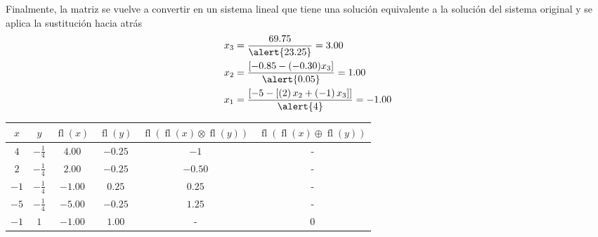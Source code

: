 \documentclass[
	spanish,
	8pt,
	utf8,
	xcolor=table,
	handout,
	aspectratio=169,
	professionalfonts,
	mathserif,
	leqno,
]{beamer}
\begin{document}
\begin{frame}
\begin{minipage}{0.35\textwidth}
		Finalmente, la matriz se vuelve a convertir en un sistema
		lineal que tiene una solución equivalente a la solución del
		sistema original y se aplica la sustitución hacia atrás
		\begin{align*}
			x_{3} & =\frac{69.75}{\alert{23.25}}=3.00                                                              \\
			x_{2} & =\frac{\left[-0.85-(-0.30)x_{3}\right]}{\alert{0.05}}=1.00                                     \\
			x_{1} & =\frac{\left[-5-\left[\left(2\right)x_{2}+\left(-1\right)x_{3}\right]\right]}{\alert{4}}=-1.00
		\end{align*}
	\end{minipage}
	\begin{minipage}{0.6\textwidth}
		\begin{table}[ht!]
			\centering
			\tiny
			\begin{tabular}{|cccccc|}
				\hline
				$x$                                                                                                   & $y$                               &
				$\operatorname{fl}\left(x\right)$                                                                     & $\operatorname{fl}\left(y\right)$ &
				$\operatorname{fl}\left(\operatorname{fl}\left(x\right)\otimes\operatorname{fl}\left(y\right)\right)$ &
				$\operatorname{fl}\left(\operatorname{fl}\left(x\right)\oplus\operatorname{fl}\left(y\right)\right)$                                                                              \\
				\hline
				$4$                                                                                                   & $-\tfrac{1}{4}$                   & $4.00$  & $-0.25$ & $-1$    & -       \\
				$2$                                                                                                   & $-\tfrac{1}{4}$                   & $2.00$  & $-0.25$ & $-0.50$ & -       \\
				$-1$                                                                                                  & $-\tfrac{1}{4}$                   & $-1.00$ & $0.25$  & $0.25$  & -       \\
				$-5$                                                                                                  & $-\tfrac{1}{4}$                   & $-5.00$ & $-0.25$ & $1.25$  & -       \\
				$-1$                                                                                                  & $1$                               & $-1.00$ & $1.00$  & -       & $0$     \\

\end{tabular}
\end{table}
\end{minipage}
\end{frame}
\end{document}

